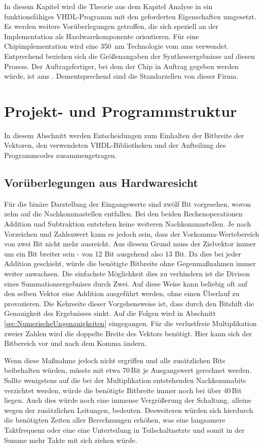 

In diesem Kapitel wird die Theorie aus dem Kapitel Analyse in ein funktionsfähiges VHDL-Programm mit den geforderten Eigenschaften
umgesetzt.
Es werden weitere Vorüberlegungen getroffen, die sich speziell an der Implementation als Hardwarekomponente orientieren.
Für eine Chipimplementation wird eine \SI{350}{nm} Technologie vom \gls{ams} verwendet.
Entprechend beziehen
sich die Größenangaben der Syntheseergebnisse auf diesen Prozess. Der Auftragsfertiger, bei dem der Chip in Auftrag  gegeben werden würde, ist \gls{ams}
. Dementsprechend sind die Standarzellen von dieser Firma.


\section{Projekt- und Programmstruktur}
In diesem Abschnitt werden Entscheidungen zum Einhalten der Bitbreite der Vektoren, den verwendeten VHDL-Bibliotheken und der Aufteilung des Programmcodes zusammengetragen.

 \subsection{Vorüberlegungen aus Hardwaresicht}
 Für die binäre Darstellung der Eingangswerte sind zwölf Bit vorgesehen, wovon zehn auf die 
 Nachkommastellen entfallen. Bei den beiden Rechenoperationen Addition und Subtraktion
 entstehen keine weiteren Nachkommastellen. Je nach Vorzeichen und Zahlenwert kann es jedoch sein,
 dass der Vorkomma-Wertebereich von zwei Bit nicht mehr ausreicht. Aus diesem Grund muss der Zielvektor
  immer um ein Bit breiter sein - von 12 Bit ausgehend also 13 Bit.
  Da dies bei jeder Addition geschieht, würde die benötigte Bitbreite ohne Gegenmaßnahmen immer 
  weiter anwachsen. Die einfachste Möglichkeit dies zu verhindern ist die Divison eines Summationsergebnises
  durch Zwei. 
  Auf diese Weise kann beliebig oft auf den selben Vektor eine Addition ausgeführt werden, ohne einen Überlauf zu provozieren.
  Die Kehrseite dieser Vorgehensweise ist, dass durch den Bitshift die Genauigkeit des Ergebnisses sinkt.
  Auf die Folgen wird in Abschnitt \ref{sec:NumerischeUngenauigkeiten} eingegangen.
  Für die verlustfreie Multiplikation zweier Zahlen wird die doppelte Breite des Vektors 
  benötigt. Hier kann sich der Bitbereich vor und nach dem Komma ändern.
  
  Wenn diese Maßnahme jedoch nicht ergriffen und alle zusätzlichen Bits beibehalten 
  würden, müsste mit etwa 70\,Bit je Ausgangswert gerechnet werden. Sollte wenigstens
  auf die bei der Multiplikation entstehenden Nachkommabits verzichtet werden, 
  würde die benötigte Bitbreite immer noch bei über 40\,Bit liegen.
  Auch dies würde noch eine immense Vergrößerung der Schaltung, alleine wegen der zusätzlichen
  Leitungen, bedeuten. Desweiteren würden sich hierdurch die benötigten Zeiten aller Berechnungen erhöhen, 
  was eine langsamere Taktfrequenz oder eine eine Unterteilung in Teilschaltnetzte und somit in der Summe
  mehr Takte mit sich ziehen würde.
  

